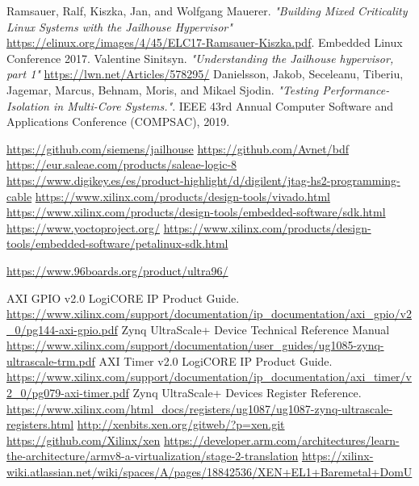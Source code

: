 \documentclass[spanish,12pt,a4paper,oneside]{book}
\begin{document}
\begin{thebibliography}{00}
   Ramsauer, Ralf, Kiszka, Jan, and Wolfgang Mauerer. \emph{"Building Mixed Criticality Linux Systems with the Jailhouse Hypervisor"} \url{https://elinux.org/images/4/45/ELC17-Ramsauer-Kiszka.pdf}. Embedded Linux Conference 2017.
   Valentine Sinitsyn. \emph{"Understanding the Jailhouse hypervisor, part 1"} \url{https://lwn.net/Articles/578295/}
   Danielsson, Jakob, Seceleanu, Tiberiu, Jagemar, Marcus, Behnam, Moris, and Mikael Sjodin. \emph{"Testing Performance-Isolation in Multi-Core Systems."}. IEEE 43rd Annual Computer Software and Applications Conference (COMPSAC), 2019.

   \url{https://github.com/siemens/jailhouse}
   \url{https://github.com/Avnet/bdf}
   \url{https://eur.saleae.com/products/saleae-logic-8}
   \url{https://www.digikey.es/es/product-highlight/d/digilent/jtag-hs2-programming-cable}
   \url{https://www.xilinx.com/products/design-tools/vivado.html}
  \url{https://www.xilinx.com/products/design-tools/embedded-software/sdk.html}
  \url{https://www.yoctoproject.org/}
  \url{https://www.xilinx.com/products/design-tools/embedded-software/petalinux-sdk.html}

   \url{https://www.96boards.org/product/ultra96/}

   AXI GPIO v2.0 LogiCORE IP Product Guide. \url{https://www.xilinx.com/support/documentation/ip_documentation/axi_gpio/v2_0/pg144-axi-gpio.pdf}
   Zynq UltraScale+ Device Technical Reference Manual \url{https://www.xilinx.com/support/documentation/user_guides/ug1085-zynq-ultrascale-trm.pdf}
   AXI Timer v2.0 LogiCORE IP Product Guide. \url{https://www.xilinx.com/support/documentation/ip_documentation/axi_timer/v2_0/pg079-axi-timer.pdf}
   Zynq UltraScale+ Devices Register Reference. \url{https://www.xilinx.com/html_docs/registers/ug1087/ug1087-zynq-ultrascale-registers.html}
   \url{http://xenbits.xen.org/gitweb/?p=xen.git}
   \url{https://github.com/Xilinx/xen}
   \url{https://developer.arm.com/architectures/learn-the-architecture/armv8-a-virtualization/stage-2-translation}
   \url{https://xilinx-wiki.atlassian.net/wiki/spaces/A/pages/18842536/XEN+EL1+Baremetal+DomU}
\end{thebibliography}
\end{document}
